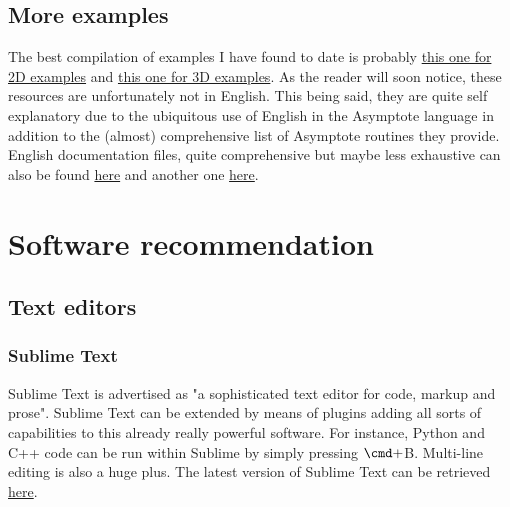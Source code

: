 \documentclass{report}
\begin{document}
\subsection{More examples}
The best compilation of examples I have found to date is probably \href{https://drive.google.com/file/d/0Bzf79yzZcPJJc0dWTHNZMkhqTGc/view?usp=sharing}{this one for 2D examples} and
\href{https://drive.google.com/file/d/0Bzf79yzZcPJJYld2cnhqWXZNU28/view?usp=sharing}{ this one for 3D examples}. As the reader will soon notice, these resources are unfortunately not in English. This being said, they are quite self explanatory due to the ubiquitous use of English in the Asymptote language in addition to the (almost) comprehensive list of Asymptote routines they provide. English documentation files, quite comprehensive but maybe less exhaustive can also be found \href{http://asymptote.sourceforge.net/asymptote.pdf}{here} and another one \href{https://math.uchicago.edu/~cstaats/Charles_Staats_III/Notes_and_papers_files/asymptote_tutorial.pdf}{here}.

\section{Software recommendation}
\subsection{Text editors}
\subsubsection{Sublime Text}
Sublime Text is advertised as "a sophisticated text editor for code, markup and prose". Sublime Text can be extended by means of plugins adding all sorts of capabilities to this already really powerful software. For instance, Python and C++ code can be run within Sublime by simply pressing $\cmd + $B. Multi-line editing is also a huge plus.
The latest version of Sublime Text can be retrieved \href{https://www.sublimetext.com/}{here}. 
\end{document}
